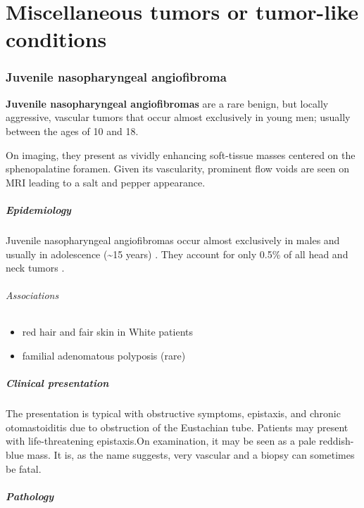 \chapter{Miscellaneous tumors or tumor-like conditions}

\subsection{Juvenile nasopharyngeal angiofibroma}

\textbf{Juvenile nasopharyngeal angiofibromas} are a rare benign, but locally aggressive, vascular tumors that occur almost exclusively in young men; usually between the ages of 10 and 18.

On imaging, they present as vividly enhancing soft-tissue masses centered on the sphenopalatine foramen. Given its vascularity, prominent flow voids are seen on MRI leading to a salt and pepper appearance.

\paragraph{Epidemiology}

Juvenile nasopharyngeal angiofibromas occur almost exclusively in males and usually in adolescence (\textasciitilde15 years) . They account for only 0.5\% of all head and neck tumors .

\subparagraph{Associations}

\begin{itemize}
	\item
	red hair and fair skin in White patients 
	\item
	familial adenomatous polyposis (rare) 
\end{itemize}

\paragraph{Clinical presentation}

The presentation is typical with obstructive symptoms, epistaxis, and chronic otomastoiditis due to obstruction of the Eustachian tube. Patients may present with life-threatening epistaxis.On examination, it may be seen as a pale reddish-blue mass. It is, as the name suggests, very vascular and a biopsy can sometimes be fatal.

\paragraph{Pathology}

